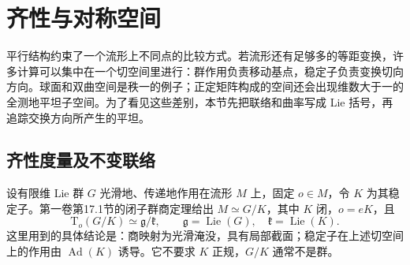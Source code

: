 
% 
% 
% 
% 
% 

\section{齐性与对称空间}
\label{g3:sec:0504}

平行结构约束了一个流形上不同点的比较方式。若流形还有足够多的等距变换，许多计算可以集中在一个切空间里进行：群作用负责移动基点，稳定子负责变换切向方向。球面和双曲空间是秩一的例子；正定矩阵构成的空间还会出现维数大于一的全测地平坦子空间。为了看见这些差别，本节先把联络和曲率写成 Lie 括号，再追踪交换方向所产生的平坦。

\subsection{齐性度量及不变联络}
\label{g3:subsec:0504:01}

设有限维 Lie 群 \(G\) 光滑地、传递地作用在流形 \(M\) 上，固定 \(o\in M\)，令 \(K\) 为其稳定子。第一卷第17.1节的闭子群商定理给出 \(M\simeq G/K\)，其中 \(K\) 闭，\(o=eK\)，且
\[
	\mathrm T_o(G/K)\simeq\mathfrak g/\mathfrak k,
	\qquad \mathfrak g=\operatorname{Lie}(G),\quad
	\mathfrak k=\operatorname{Lie}(K).
\]
这里用到的具体结论是：商映射为光滑淹没，具有局部截面；稳定子在上述切空间上的作用由 \(\operatorname{Ad}(K)\) 诱导。它不要求 \(K\) 正规，\(G/K\) 通常不是群。

